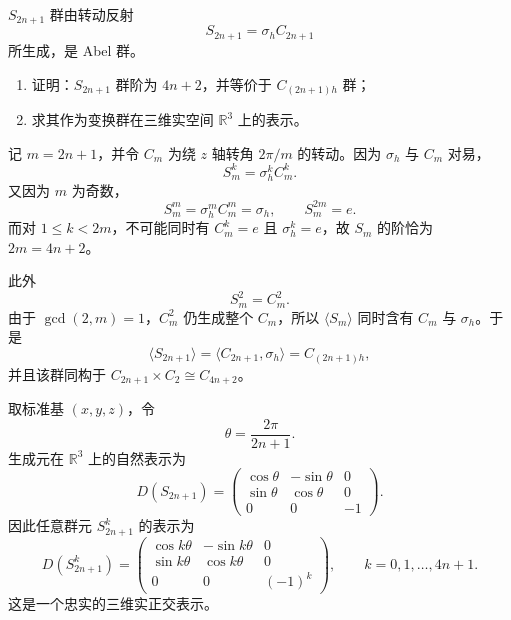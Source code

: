 \begin{question}[15 分]
$S_{2n+1}$ 群由转动反射
\[
S_{2n+1}=\sigma_h C_{2n+1}
\]
所生成，是 Abel 群。
\begin{enumerate}
  \item 证明：$S_{2n+1}$ 群阶为 $4n+2$，并等价于 $C_{(2n+1)h}$ 群；
  \item 求其作为变换群在三维实空间 $\mathbb R^3$ 上的表示。
\end{enumerate}
\begin{solution}
记 $m=2n+1$，并令 $C_m$ 为绕 $z$ 轴转角 $2\pi/m$ 的转动。因为 $\sigma_h$ 与 $C_m$ 对易，
\[
S_m^k=\sigma_h^k C_m^k.
\]
又因为 $m$ 为奇数，
\[
S_m^m=\sigma_h^m C_m^m=\sigma_h,
\qquad S_m^{2m}=e.
\]
而对 $1\le k<2m$，不可能同时有 $C_m^k=e$ 且 $\sigma_h^k=e$，故 $S_m$ 的阶恰为 $2m=4n+2$。

此外
\[
S_m^2=C_m^2.
\]
由于 $\gcd(2,m)=1$，$C_m^2$ 仍生成整个 $C_m$，所以 $\langle S_m\rangle$ 同时含有 $C_m$ 与 $\sigma_h$。于是
\[
\boxed{\langle S_{2n+1}\rangle
=\langle C_{2n+1},\sigma_h\rangle
=C_{(2n+1)h}},
\]
并且该群同构于 $C_{2n+1}\times C_2\cong C_{4n+2}$。

取标准基 $(x,y,z)$，令
\[
\theta=\frac{2\pi}{2n+1}.
\]
生成元在 $\mathbb R^3$ 上的自然表示为
\[
D(S_{2n+1})=
\begin{pmatrix}
\cos\theta&-\sin\theta&0\\
\sin\theta&\cos\theta&0\\
0&0&-1
\end{pmatrix}.
\]
因此任意群元 $S_{2n+1}^k$ 的表示为
\[
\boxed{
D(S_{2n+1}^k)=
\begin{pmatrix}
\cos k\theta&-\sin k\theta&0\\
\sin k\theta&\cos k\theta&0\\
0&0&(-1)^k
\end{pmatrix}},
\qquad k=0,1,\ldots,4n+1.
\]
这是一个忠实的三维实正交表示。
\end{solution}
\end{question}

